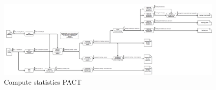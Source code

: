 \documentclass{vldb}
\begin{document}
\begin{figure}[h]
\includegraphics[angle=90,height=0.9\textheight]{images/strato_pact_pt2.png} 
\caption{Compute statistics PACT}
\label{fig:statistics}
\end{figure}


\end{document}
